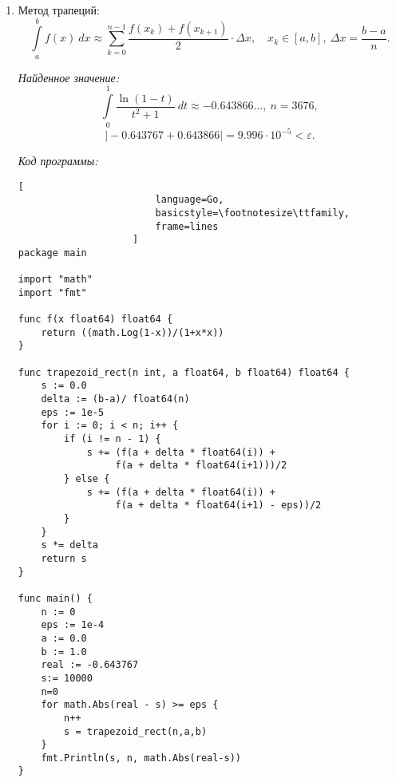 \documentclass[14pt, a4paper, titlepage, fleqn]{extarticle}
\begin{document}
\begin{enumerate}
\begin{lstlisting}[
                        language=Go,
                        basicstyle=\footnotesize\ttfamily,
                        frame=lines
                    ]
func center_rect(n int, a float64, b float64) float64 {
    s := 0.0
    delta := (b-a)/ float64(n)
    for i := 0; i < n; i++ {
        s += f((2*a + delta * float64(2*i + 1))/2)
    }
    s *= delta
    return s
}

func main() {
    n := 0
    eps := 1e-4
    a := 0.0
    b := 1.0
    real := -0.643767
    s := 10000
    n=0
    for math.Abs(real - s) >= eps {
        n++
        s = center_rect(n,a,b)
    }
    fmt.Println(s, n, math.Abs(real-s))
}
                    \end{lstlisting}
                
                    \pagebreak

                \item Метод трапеций:
                    \[
                        \int\limits_a^b f(x) ~ dx \approx
                        \sum_{k=0}^{n-1} 
                        \frac{f\left( x_k \right) + f\left(x_{k+1}\right)}{2}
                        \cdot \Delta x,
                        \quad x_k \in [a, b], ~ \Delta x = \frac{b-a}{n}.  
                    \]

                    \textit{Найденное значение:}
                    \[
                        \int\limits_0^1 \frac{\ln(1-t)}{t^2+1} ~ dt \approx
                        -0.643866\dots, ~ n = 3676,
                    \]
                    \[
                        \vert-0.643767+0.643866\vert = 9.996
                        \cdot 10^{-5} < \varepsilon.
                    \]

                    \pagebreak

                    \textit{Код программы:}
                    \begin{lstlisting}[
                        language=Go,
                        basicstyle=\footnotesize\ttfamily,
                        frame=lines
                    ]
package main

import "math"
import "fmt"

func f(x float64) float64 {
    return ((math.Log(1-x))/(1+x*x))
}

func trapezoid_rect(n int, a float64, b float64) float64 {
    s := 0.0
    delta := (b-a)/ float64(n)
    eps := 1e-5
    for i := 0; i < n; i++ {
        if (i != n - 1) {
            s += (f(a + delta * float64(i)) +
                 f(a + delta * float64(i+1)))/2
        } else {
            s += (f(a + delta * float64(i)) +
                 f(a + delta * float64(i+1) - eps))/2
        }
    }
    s *= delta
    return s
}

func main() {
    n := 0
    eps := 1e-4
    a := 0.0
    b := 1.0
    real := -0.643767
    s:= 10000
    n=0
    for math.Abs(real - s) >= eps {
        n++
        s = trapezoid_rect(n,a,b)
    }
    fmt.Println(s, n, math.Abs(real-s))
}
                \end{lstlisting}
            \end{enumerate}
\end{document}
